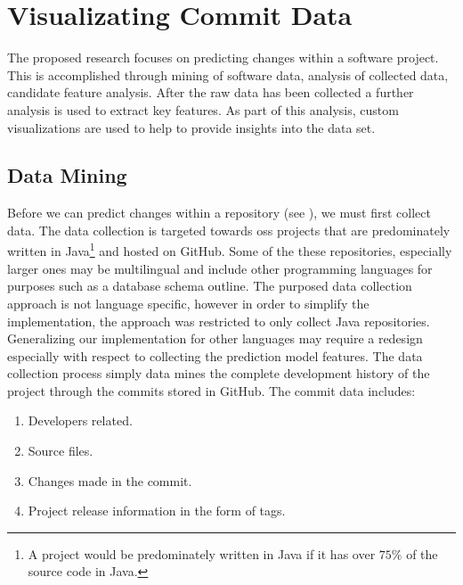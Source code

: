 \chapter{Visualizating Commit Data}
\label{chap:visualization}

The proposed research focuses on predicting changes within a software project. This is accomplished through mining of software data, analysis of collected data, candidate feature analysis. After the raw data has been collected a further analysis is used to extract key features. As part of this analysis, custom visualizations are used to help to provide insights into the data set. %

\section{Data Mining}
\label{sec:data_mining}

Before we can predict changes within a repository (see ), we must first collect data. The data collection is targeted towards \gls{oss} projects that are predominately written in Java\footnote{A project would be predominately written in Java if it has over $75\%$ of the source code in Java.} and hosted on GitHub. Some of the these repositories, especially larger ones may be multilingual and include other programming languages for purposes such as a database schema outline. The purposed data collection approach is not language specific, however in order to simplify the implementation, the approach was restricted to only collect Java repositories. Generalizing our implementation for other languages may require a redesign especially with respect to collecting the prediction model features. The data collection process simply data mines the complete development history of the project through the commits stored in GitHub. The commit data includes:
\begin{enumerate}
\item Developers related.
\item Source files.
\item Changes made in the commit.
\item Project release information in the form of tags.
\end{enumerate}


